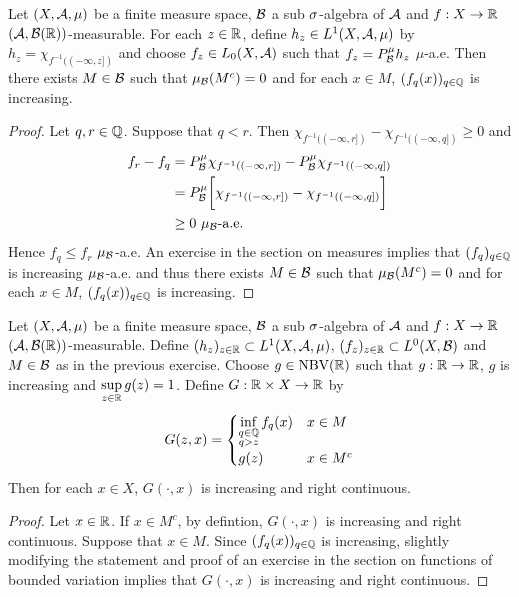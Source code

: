 \documentclass{book}
\begin{document}
	\begin{ex}
		Let $(X, \mathcal{A}, \mu)$ be a finite measure space, $\mathcal{B}$ a sub $\sigma$-algebra of $\mathcal{A}$ and $f: X \rightarrow \mathbb{R}$ $(\mathcal{A}, \mathcal{B}(\mathbb{R}))$-measurable. For each $z \in \mathbb{R}$, define $h_z \in L^1(X, \mathcal{A}, \mu)$ by $h_z = \chi_{f^{-1}((-\infty, z])}$ and choose $f_z \in L_0(X, \mathcal{A})$ such that $f_z = P^{\mu}_{\mathcal{B}}h_z$ $\mu$-a.e. Then there exists $M \in \mathcal{B}$ such that $\mu_{\mathcal{B}}(M^c) = 0$ and for each $x \in M$, $(f_q(x))_{q \in \mathbb{Q}}$ is increasing.
	\end{ex}
	
	\begin{proof}
		Let $q, r \in \mathbb{Q}$. Suppose that $q < r$. Then $\chi_{f^{-1}((-\infty, r])} - \chi_{f^{-1}((-\infty, q])} \geq 0$ and
		\begin{align*}
			f_r - f_q 
			& = P^{\mu}_{\mathcal{B}} \chi_{f^{-1}((-\infty, r])} - P^{\mu}_{\mathcal{B}} \chi_{f^{-1}((-\infty, q])} \\
			& = P^{\mu}_{\mathcal{B}} \bigg[ \chi_{f^{-1}((-\infty, r])} - \chi_{f^{-1}((-\infty, q])} \bigg] \\\
			& \geq 0 \text{ $\mu_{\mathcal{B}}$-a.e.}
		\end{align*}
		Hence $f_q \leq f_r$ $\mu_{\mathcal{B}}$-a.e. An exercise in the section on measures implies that $(f_q)_{q \in \mathbb{Q}}$ is increasing $\mu_{\mathcal{B}}$-a.e. and thus there exists $M \in \mathcal{B}$ such that $\mu_{\mathcal{B}}(M^c) = 0$ and for each $x \in M$, $(f_q(x))_{q \in \mathbb{Q}}$ is increasing.
	\end{proof}
	
	\begin{ex}
		Let $(X, \mathcal{A}, \mu)$ be a finite measure space, $\mathcal{B}$ a sub $\sigma$-algebra of $\mathcal{A}$ and $f: X \rightarrow \mathbb{R}$ $(\mathcal{A}, \mathcal{B}(\mathbb{R}))$-measurable. Define $(h_z)_{z \in \mathbb{R}} \subset L^1(X, \mathcal{A}, \mu)$, $(f_z)_{z \in \mathbb{R}} \subset L^0(X, \mathcal{B})$ and $M \in \mathcal{B}$ as in the previous exercise. Choose $g \in \text{NBV}(\mathbb{R})$ such that $g: \mathbb{R} \rightarrow \mathbb{R}$, $g$ is increasing and $\sup\limits_{z \in \mathbb{R}} g(z) = 1$. Define $G: \mathbb{R} \times X \rightarrow \mathbb{R}$ by 
		\[
		G(z, x) = 
		\begin{cases}
			\inf\limits_{\substack{q \in \mathbb{Q} \\ q > z}}f_q(x) & x \in M \\
			g(z) & x \in M^c
		\end{cases}
		\] 
		Then for each $x \in X$, $G(\cdot, x)$ is increasing and right continuous.
	\end{ex}

	\begin{proof}
		Let $x \in \mathbb{R}$. If $x \in M^c$, by defintion, $G(\cdot, x)$ is increasing and right continuous. Suppose that $x \in M$. Since $(f_q(x))_{q \in \mathbb{Q}}$ is increasing, slightly modifying the statement and proof of an exercise in the section on functions of bounded variation implies that $G(\cdot, x)$ is increasing and right continuous.
	\end{proof}
\end{document}
